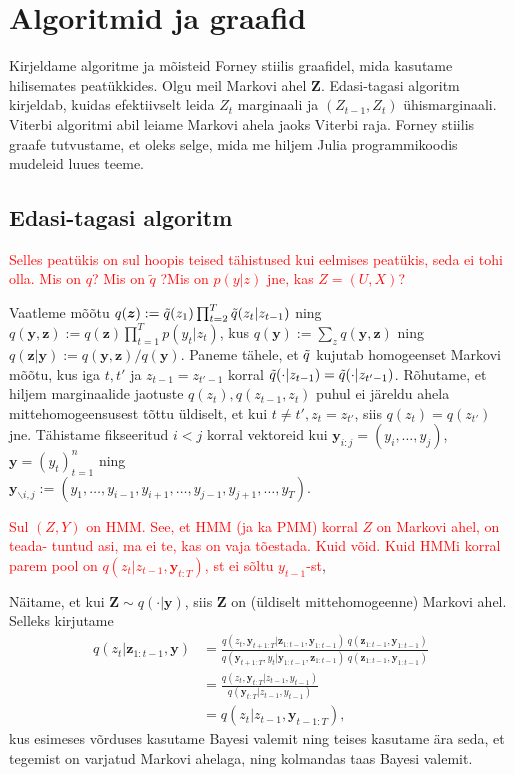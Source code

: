 
\section{Algoritmid ja graafid}

Kirjeldame algoritme ja mõisteid Forney stiilis graafidel, mida kasutame hilisemates peatükkides. Olgu meil Markovi ahel $\bm{Z}$. Edasi-tagasi algoritm kirjeldab, kuidas efektiivselt leida $Z_t$ marginaali ja $(Z_{t-1},Z_t)$ ühismarginaali. Viterbi algoritmi abil leiame Markovi ahela jaoks Viterbi raja. Forney stiilis graafe tutvustame, et oleks selge, mida me hiljem Julia programmikoodis mudeleid luues teeme.

\subsection{Edasi-tagasi algoritm}
\label{chapter:forw_back}

\textcolor{red}{Selles peatükis on sul hoopis teised tähistused kui eelmises peatükis, seda ei tohi olla. Mis on $q$? Mis on $\tilde{q}$ ?Mis on $p(y|z)$ jne, kas $Z=(U,X)$?}

Vaatleme mõõtu $q(\bm{z}) := \Tilde{q}(z_1) \prod_{t=2}^T \Tilde{q}(z_{t} | z_{t-1})$ ning $q(\bm{y},\bm{z}) := q(\bm{z}) \prod_{t=1}^T p(y_t | z_t)$, kus $q(\bm{y}) := \sum_{z} q(\bm{y},\bm{z})$ ning $q(\bm{z}|\bm{y}) := q(\bm{y},\bm{z})/q(\bm{y})$. Paneme tähele, et $\Tilde{q}$ kujutab homogeenset Markovi mõõtu, kus iga $t,t'$ ja $z_{t-1}=z_{t'-1}$ korral $\Tilde{q}(\cdot|z_{t-1}) = \Tilde{q}(\cdot|z_{t'-1})$. Rõhutame, et hiljem marginaalide jaotuste $q(z_t),q(z_{t-1},z_t)$ puhul ei järeldu ahela mittehomogeensusest tõttu üldiselt, et kui $t \ne t', z_t=z_{t'}$, siis $q(z_t) = q(z_{t'})$ jne. Tähistame fikseeritud $i < j$ korral vektoreid kui $\bm{y}_{i:j} = (y_i,\ldots,y_j)$, $\bm{y} = (y_t)_{t=1}^n$ ning \\
$\bm{y}_{\backslash i, j} := (y_1,\ldots,y_{i-1},y_{i+1},\ldots,y_{j-1},y_{j+1},\ldots,y_T)$.


\textcolor{red}{Sul $(Z,Y)$ on HMM. See, et HMM (ja ka PMM) korral $Z$ on Markovi ahel, on teada- tuntud asi, ma ei te, kas on vaja tõestada. Kuid võid. Kuid HMMi korral parem pool on   $q(z_t | z_{t-1}, \bm{y}_{t:T})$, st ei sõltu $y_{t-1}$-st},  

Näitame, et kui $\bm{Z} \sim q(\cdot | \bm{y})$, siis $\bm{Z}$ on (üldiselt mittehomogeenne) Markovi ahel. Selleks kirjutame
\begin{align*}
    q(z_{t} | \bm{z}_{1:t-1}, \bm{y}) &= \frac{q(z_t, \bm{y}_{t+1:T} | \bm{z}_{1:t-1}, \bm{y}_{1:t-1}) \ q(\bm{z}_{1:t-1}, \bm{y}_{1:t-1})}{q(\bm{y}_{t+1:T}, y_t | \bm{y}_{1:t-1}, \bm{z}_{1:t-1}) \ q(\bm{z}_{1:t-1}, \bm{y}_{1:t-1})}\\
    &= \frac{q(z_t, \bm{y}_{t:T} | z_{t-1}, y_{t-1})}{q(\bm{y}_{t:T} | z_{t-1}, y_{t-1})} \\
    &= q(z_t | z_{t-1}, \bm{y}_{t-1:T}),
\end{align*}
kus esimeses võrduses kasutame Bayesi valemit ning teises kasutame ära seda, et tegemist on varjatud Markovi ahelaga, ning kolmandas taas Bayesi valemit.

